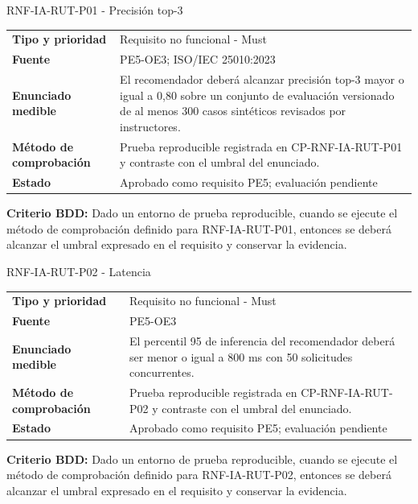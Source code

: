 \documentclass[11pt,a4paper]{article}
\begin{document}
\begin{reqbox}[colframe=Teal]{RNF-IA-RUT-P01 - Precisión top-3}
\begin{tabularx}{\textwidth}{>{\bfseries}p{3.2cm}Y}
Tipo y prioridad & Requisito no funcional - Must \\
Fuente & PE5-OE3; ISO/IEC 25010:2023 \\
Enunciado medible & El recomendador deberá alcanzar precisión top-3 mayor o igual a 0,80 sobre un conjunto de evaluación versionado de al menos 300 casos sintéticos revisados por instructores. \\
Método de comprobación & Prueba reproducible registrada en CP-RNF-IA-RUT-P01 y contraste con el umbral del enunciado. \\
Estado & Aprobado como requisito PE5; evaluación pendiente \\
\end{tabularx}
\textbf{Criterio BDD:} Dado un entorno de prueba reproducible, cuando se ejecute el método de comprobación definido para RNF-IA-RUT-P01, entonces se deberá alcanzar el umbral expresado en el requisito y conservar la evidencia.
\end{reqbox}


\begin{reqbox}[colframe=Teal]{RNF-IA-RUT-P02 - Latencia}
\begin{tabularx}{\textwidth}{>{\bfseries}p{3.2cm}Y}
Tipo y prioridad & Requisito no funcional - Must \\
Fuente & PE5-OE3 \\
Enunciado medible & El percentil 95 de inferencia del recomendador deberá ser menor o igual a 800 ms con 50 solicitudes concurrentes. \\
Método de comprobación & Prueba reproducible registrada en CP-RNF-IA-RUT-P02 y contraste con el umbral del enunciado. \\
Estado & Aprobado como requisito PE5; evaluación pendiente \\
\end{tabularx}
\textbf{Criterio BDD:} Dado un entorno de prueba reproducible, cuando se ejecute el método de comprobación definido para RNF-IA-RUT-P02, entonces se deberá alcanzar el umbral expresado en el requisito y conservar la evidencia.
\end{reqbox}
\end{document}
